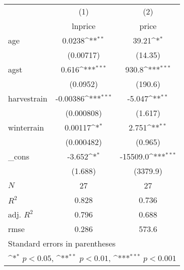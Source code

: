 {
\def\sym#1{\ifmmode^{#1}\else\(^{#1}\)\fi}
\begin{tabular}{l*{2}{c}}
\hline\hline
            &\multicolumn{1}{c}{(1)}&\multicolumn{1}{c}{(2)}\\
            &\multicolumn{1}{c}{lnprice}&\multicolumn{1}{c}{price}\\
\hline
age         &      0.0238\sym{**} &       39.21\sym{*}  \\
            &   (0.00717)         &     (14.35)         \\
[1em]
agst        &       0.616\sym{***}&       930.8\sym{***}\\
            &    (0.0952)         &     (190.6)         \\
[1em]
harvestrain &    -0.00386\sym{***}&      -5.047\sym{**} \\
            &  (0.000808)         &     (1.617)         \\
[1em]
winterrain  &     0.00117\sym{*}  &       2.751\sym{**} \\
            &  (0.000482)         &     (0.965)         \\
[1em]
\_cons      &      -3.652\sym{*}  &    -15509.0\sym{***}\\
            &     (1.688)         &    (3379.9)         \\
\hline
\(N\)       &          27         &          27         \\
\(R^{2}\)   &       0.828         &       0.736         \\
adj. \(R^{2}\)&       0.796         &       0.688         \\
rmse        &       0.286         &       573.6         \\
\hline\hline
\multicolumn{3}{l}{\footnotesize Standard errors in parentheses}\\
\multicolumn{3}{l}{\footnotesize \sym{*} \(p<0.05\), \sym{**} \(p<0.01\), \sym{***} \(p<0.001\)}\\
\end{tabular}
}
